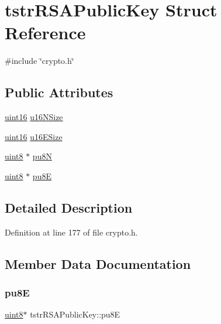\hypertarget{structtstrRSAPublicKey}{}\section{tstr\+R\+S\+A\+Public\+Key Struct Reference}
\label{structtstrRSAPublicKey}


{\ttfamily \#include \char`\"{}crypto.\+h\char`\"{}}

\subsection*{Public Attributes}
\begin{DoxyCompactItemize}
\item 
\hyperlink{group__DataT_ga1daa745171fc6e31d942c161422a76f9}{uint16} \hyperlink{structtstrRSAPublicKey_a388e03d722ab1e65a51c05e418883df5}{u16\+N\+Size}
\item 
\hyperlink{group__DataT_ga1daa745171fc6e31d942c161422a76f9}{uint16} \hyperlink{structtstrRSAPublicKey_ad9101c76a4440b6a387a7a70b6efe86c}{u16\+E\+Size}
\item 
\hyperlink{group__DataT_ga4df709a77647e870bbf1d955b8edc9a6}{uint8} $\ast$ \hyperlink{structtstrRSAPublicKey_a407c76a01894f8d3bfe260a11978fac8}{pu8N}
\item 
\hyperlink{group__DataT_ga4df709a77647e870bbf1d955b8edc9a6}{uint8} $\ast$ \hyperlink{structtstrRSAPublicKey_a665f0d083207cbff10e2ac044a1ce27b}{pu8E}
\end{DoxyCompactItemize}


\subsection{Detailed Description}


Definition at line 177 of file crypto.\+h.



\subsection{Member Data Documentation}
\mbox{\label{structtstrRSAPublicKey_a665f0d083207cbff10e2ac044a1ce27b}} 
\subsubsection{\texorpdfstring{pu8E}{pu8E}}
{\footnotesize\ttfamily \hyperlink{group__DataT_ga4df709a77647e870bbf1d955b8edc9a6}{uint8}$\ast$ tstr\+R\+S\+A\+Public\+Key\+::pu8E}



